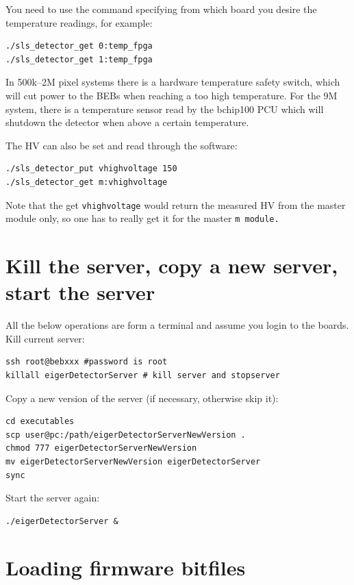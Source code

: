 \documentclass{article}
\begin{document}
You need to use the command specifying from which board you desire the temperature readings, for example:
\begin{verbatim}
./sls_detector_get 0:temp_fpga
./sls_detector_get 1:temp_fpga
\end{verbatim}
In 500k--2M pixel systems there is a hardware temperature safety switch, which will cut power to the BEBs when reaching a too high temperature. For the 9M system, there is a temperature sensor read by the bchip100 PCU which will shutdown the detector when above a certain temperature.
 
The HV can also be set and read through the software:
\begin{verbatim}
./sls_detector_put vhighvoltage 150
./sls_detector_get m:vhighvoltage 
\end{verbatim}
Note that the get {\tt{vhighvoltage}} would return the measured HV from the master module only, so one has to really get it for the master \tt{m} module.

\appendix

\section{Kill the server, copy a new server, start the server}
All the below operations are form a terminal and assume you login to the boards.\\
Kill current server:
\begin{verbatim}
ssh root@bebxxx #password is root
killall eigerDetectorServer # kill server and stopserver
\end{verbatim}
Copy a new version of the server (if necessary, otherwise skip it):
\begin{verbatim}
cd executables
scp user@pc:/path/eigerDetectorServerNewVersion .
chmod 777 eigerDetectorServerNewVersion
mv eigerDetectorServerNewVersion eigerDetectorServer
sync
\end{verbatim}
Start the server again:
\begin{verbatim}
./eigerDetectorServer &
\end{verbatim}


\section{Loading firmware bitfiles}
\end{document}
